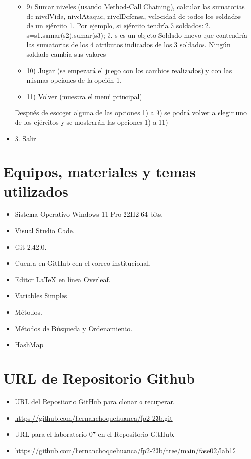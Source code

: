 \documentclass{article}
\begin{document}
\begin{itemize}
\begin{itemize}
            \item 9) Sumar niveles (usando Method-Call Chaining), calcular las sumatorias de nivelVida, nivelAtaque, nivelDefensa, velocidad de todos los soldados de un ejército
            1. Por ejemplo, si ejército tendría 3 soldados:
            2. s=s1.sumar(s2).sumar(s3);
            3. s es un objeto Soldado nuevo que contendría las sumatorias de los 4 atributos indicados de los 3 soldados. Ningún soldado cambia sus valores
            \item 10) Jugar (se empezará el juego con los cambios realizados) y con las mismas opciones de la opción 1.
            \item 11) Volver (muestra el menú principal)
        \end{itemize}

        Después de escoger alguna de las opciones 1) a 9) se podrá volver a elegir uno de los ejércitos y se mostrarán las opciones 1) a 11)
        \item 3. Salir

	\end{itemize}
		
\section{Equipos, materiales y temas utilizados}
	\begin{itemize}
		\item Sistema Operativo Windows 11 Pro 22H2 64 bits.
		\item Visual Studio Code.
		\item Git 2.42.0.
		\item Cuenta en GitHub con el correo institucional.
        \item Editor LaTeX en línea Overleaf.
        \item Variables Simples
        \item Métodos.
        \item Métodos de Búsqueda y Ordenamiento.
        \item HashMap
        
        
	\end{itemize}
	
\section{URL de Repositorio Github}
	\begin{itemize}
		\item URL del Repositorio GitHub para clonar o recuperar.
        \item \url{https://github.com/hernanchoquehuanca/fp2-23b.git}
		\item URL para el laboratorio 07 en el Repositorio GitHub.
		\item \url{https://github.com/hernanchoquehuanca/fp2-23b/tree/main/fase02/lab12}
	\end{itemize}
	
\end{document}
